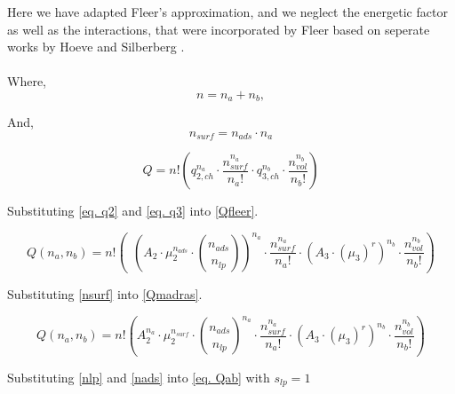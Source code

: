 \documentclass[10pt,letterpaper]{article}
\begin{document}
\noindent Here we have adapted Fleer's approximation, 
%
and we neglect the energetic factor as well as the interactions, that were incorporated by Fleer based on seperate works by Hoeve \cite{hoeve1970general}  and Silberberg \cite{silberberg1968adsorption}.\\\\

\noindent Where,
\begin{equation}
	n=n_a+n_b,
	\label{eq. n}
\end{equation}

\noindent And,
\begin{equation}
	n_{surf}=n_{ads}\cdotp n_{a}
	\label{nsurf}
\end{equation}


\begin{equation}
	Q=
	n!
	\left(
		q_{2,ch}^{n_{a}}
		\cdot
		\frac{
			n_{surf}^{n_{a}}
		}{
			n_a!
		}
		\cdot
		q_{3,ch}^{n_{b}}
		\cdot
		\frac{
			n_{vol}^{n_{b}}
		}{
			n_b!
		}
	\right)
	\label{Qfleer}
\end{equation}

\noindent Substituting \ref{eq. q2} and \ref{eq. q3} into \ref{Qfleer}.

\begin{equation}
	Q(n_a,n_b)=
	n!
	\left(~~
		\left(
		A_2
		\cdot 
		\mu_{2}^{n_{ads}}
		\cdot 
		\binom{
			n_{ads}
		}{
			n_{lp}
		}
		\right)^{n_{a}} 
		\cdot
		\frac{
			n_{surf}^{n_{a}}
		}{
			n_a!
		}
		\cdot
		\left(
			A_3
			\cdot
			\left(
				\mu_{3}
			\right)^{r}
		\right)^{n_{b}}
		\cdot
		\frac{
			n_{vol}^{n_{b}}
		}{
			n_b!
		}
	\right)
	\label{Qmadras}
\end{equation}

\noindent Substituting \ref{nsurf} into \ref{Qmadras}.

\begin{equation}
	Q(n_a,n_b)=
	n!
	\left(
		A_2^{n_{a}}
		\cdot 
		\mu_{2}^{n_{surf}} 
		\cdot 
		\binom{
			n_{ads}
		}{
			n_{lp}
		}^{n_{a}}
		\cdot
		\frac{
			n_{surf}^{n_{a}}
		}{
			n_a!
		}
		\cdot
		\left(
		A_3
		\cdot
		(\mu_{3})^{r}
	\right)^{n_{b}}
	\cdot
	\frac{
		n_{vol}^{n_{b}}
	}{
		n_b!
	}
	\right)
	\label{Qwithnsurf}
\end{equation}

\noindent Substituting \ref{nlp} and \ref{nads} into \ref{eq. Qab} with $s_{lp}=1$
\end{document}
